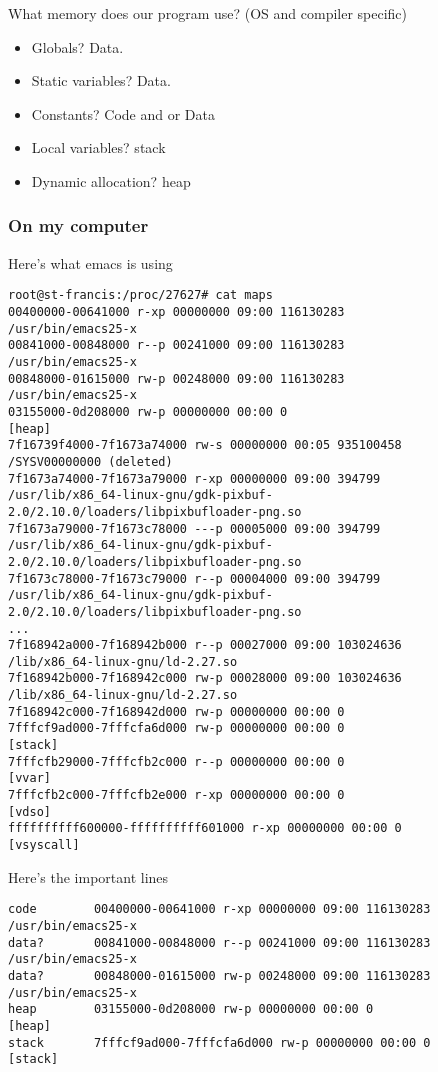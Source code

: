 \documentclass[11pt]{article}
\begin{document}
What memory does our program use? (OS and compiler specific)
\begin{itemize}
\item Globals? Data.
\item Static variables? Data.
\item Constants? Code and or Data
\item Local variables? stack
\item Dynamic allocation? heap
\end{itemize}

\subsubsection{On my computer}
\label{sec:org6d2fd6d}

Here's what emacs is using

\begin{verbatim}
root@st-francis:/proc/27627# cat maps
00400000-00641000 r-xp 00000000 09:00 116130283                          /usr/bin/emacs25-x
00841000-00848000 r--p 00241000 09:00 116130283                          /usr/bin/emacs25-x
00848000-01615000 rw-p 00248000 09:00 116130283                          /usr/bin/emacs25-x
03155000-0d208000 rw-p 00000000 00:00 0                                  [heap]
7f16739f4000-7f1673a74000 rw-s 00000000 00:05 935100458                  /SYSV00000000 (deleted)
7f1673a74000-7f1673a79000 r-xp 00000000 09:00 394799                     /usr/lib/x86_64-linux-gnu/gdk-pixbuf-2.0/2.10.0/loaders/libpixbufloader-png.so
7f1673a79000-7f1673c78000 ---p 00005000 09:00 394799                     /usr/lib/x86_64-linux-gnu/gdk-pixbuf-2.0/2.10.0/loaders/libpixbufloader-png.so
7f1673c78000-7f1673c79000 r--p 00004000 09:00 394799                     /usr/lib/x86_64-linux-gnu/gdk-pixbuf-2.0/2.10.0/loaders/libpixbufloader-png.so
...
7f168942a000-7f168942b000 r--p 00027000 09:00 103024636                  /lib/x86_64-linux-gnu/ld-2.27.so
7f168942b000-7f168942c000 rw-p 00028000 09:00 103024636                  /lib/x86_64-linux-gnu/ld-2.27.so
7f168942c000-7f168942d000 rw-p 00000000 00:00 0 
7fffcf9ad000-7fffcfa6d000 rw-p 00000000 00:00 0                          [stack]
7fffcfb29000-7fffcfb2c000 r--p 00000000 00:00 0                          [vvar]
7fffcfb2c000-7fffcfb2e000 r-xp 00000000 00:00 0                          [vdso]
ffffffffff600000-ffffffffff601000 r-xp 00000000 00:00 0                  [vsyscall]
\end{verbatim}

Here's the important lines
\begin{verbatim}
code        00400000-00641000 r-xp 00000000 09:00 116130283                          /usr/bin/emacs25-x
data?       00841000-00848000 r--p 00241000 09:00 116130283                          /usr/bin/emacs25-x
data?       00848000-01615000 rw-p 00248000 09:00 116130283                          /usr/bin/emacs25-x
heap        03155000-0d208000 rw-p 00000000 00:00 0                                  [heap]
stack       7fffcf9ad000-7fffcfa6d000 rw-p 00000000 00:00 0                          [stack]
\end{verbatim}
\end{document}
